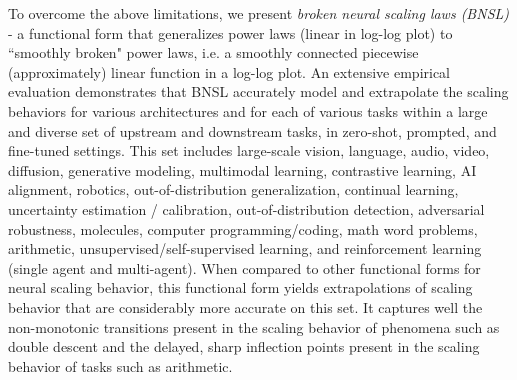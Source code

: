 \documentclass{article} %
\begin{document}
To overcome the above limitations,  we present {\it broken neural scaling laws (BNSL)} - a functional form that generalizes power laws (linear in  log-log plot) %
to ``smoothly broken" power laws, i.e. a smoothly connected piecewise (approximately) linear function in a log-log plot.  An extensive empirical evaluation demonstrates that BNSL accurately model and extrapolate the scaling behaviors for various architectures and for each of various tasks within a large and diverse set of upstream and downstream tasks, in zero-shot, prompted, and fine-tuned settings. This set includes large-scale vision, language, audio, video, diffusion, generative modeling, multimodal learning, contrastive learning, AI alignment, robotics, out-of-distribution generalization, continual learning, uncertainty estimation / calibration, out-of-distribution detection, adversarial robustness, molecules, computer programming/coding, math word problems, arithmetic, unsupervised/self-supervised learning, and reinforcement learning (single agent and multi-agent).
When compared to other functional forms for neural scaling behavior, this functional form yields extrapolations of scaling behavior that are considerably more accurate on this set. It captures well the non-monotonic transitions present in the scaling behavior of phenomena such as double descent and the delayed, sharp inflection points present in the scaling behavior of tasks such as arithmetic.


\end{document}
